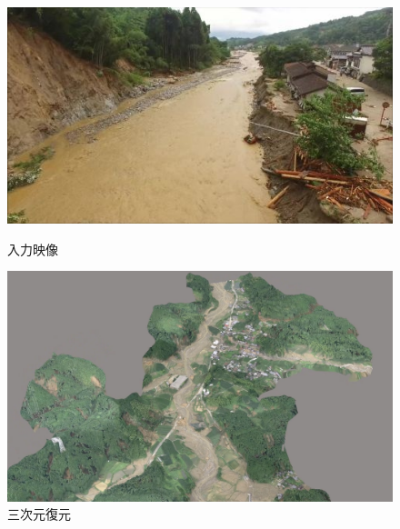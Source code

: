 \documentclass[a4paper, twocolumn, xelatex, 10pt, ja=standard, Ligatures=TeX]{bxjsarticle}
\begin{document}
	\begin{figure}[b]
		\begin{minipage}{0.48\hsize}
			\centering
			\includegraphics[width=\linewidth]{img/original.jpg}
			\caption{入力映像}
			\label{img02}
		\end{minipage}
		\begin{minipage}{0.48\hsize}
			\centering
			\includegraphics[width=\linewidth]{img/3dmodel.png}
			\caption{三次元復元}
			\label{img03}
		\end{minipage}
	\end{figure}
\end{document}
